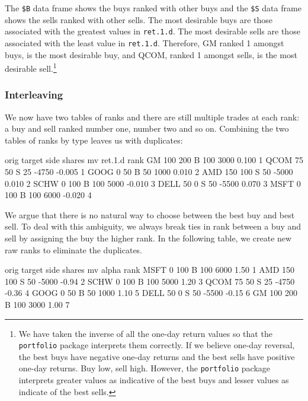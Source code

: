 \documentclass{article}
\begin{document}
The \texttt{\$B} data frame shows the buys ranked with other buys and
the \texttt{\$S} data frame shows the sells ranked with other sells.
The most desirable buys are those associated with the greatest values
in \texttt{ret.1.d}.  The most desirable sells are those associated
with the least value in \texttt{ret.1.d}.  Therefore,
GM ranked 1 amongst buys, is the most desirable
buy, and QCOM, ranked 1 amongst sells, is the most
desirable sell.\footnote{We have taken the inverse of all the one-day
return values so that the \texttt{portfolio} package interprets them
correctly.  If we believe one-day reversal, the best buys have
negative one-day returns and the best sells have positive one-day
returns.  Buy low, sell high.  However, the \texttt{portfolio} package
interprets greater values as indicative of the best buys and lesser
values as indicate of the best sells.}

\subsubsection{Interleaving}
\label{interleaving}

We now have two tables of ranks and there are still multiple trades at
each rank: a buy and sell ranked number one, number two and so on.
Combining the two tables of ranks by type leaves us with duplicates:

\begin{Schunk}
\begin{Soutput}
     orig target side shares    mv ret.1.d rank
GM    100    200    B    100  3000   0.100    1
QCOM   75     50    S     25 -4750  -0.005    1
GOOG    0     50    B     50  1000   0.010    2
AMD   150    100    S     50 -5000   0.010    2
SCHW    0    100    B    100  5000  -0.010    3
DELL   50      0    S     50 -5500   0.070    3
MSFT    0    100    B    100  6000  -0.020    4
\end{Soutput}
\end{Schunk}

We argue that there is no natural way to choose between the best buy
and best sell.  To deal with this ambiguity, we always break ties in
rank between a buy and sell by assigning the buy the higher rank.  In
the following table, we create new raw ranks to eliminate the
duplicates.

\begin{Schunk}
\begin{Soutput}
     orig target side shares    mv alpha rank
MSFT    0    100    B    100  6000  1.50    1
AMD   150    100    S     50 -5000 -0.94    2
SCHW    0    100    B    100  5000  1.20    3
QCOM   75     50    S     25 -4750 -0.36    4
GOOG    0     50    B     50  1000  1.10    5
DELL   50      0    S     50 -5500 -0.15    6
GM    100    200    B    100  3000  1.00    7
\end{Soutput}
\end{Schunk}
\end{document}
